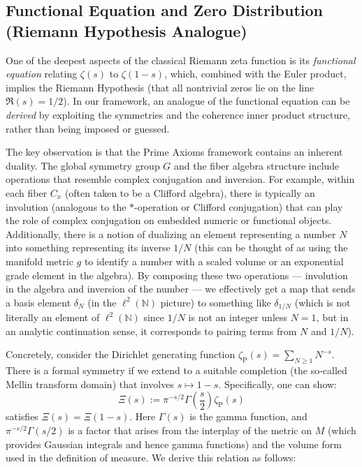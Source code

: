 \documentclass[11pt]{article}
\begin{document}
\subsection*{Functional Equation and Zero Distribution (Riemann Hypothesis Analogue)}

One of the deepest aspects of the classical Riemann zeta function is its \emph{functional equation} relating $\zeta(s)$ to $\zeta(1-s)$, which, combined with the Euler product, implies the Riemann Hypothesis (that all nontrivial zeros lie on the line $\Re(s)=1/2$). In our framework, an analogue of the functional equation can be \emph{derived} by exploiting the symmetries and the coherence inner product structure, rather than being imposed or guessed.

The key observation is that the Prime Axioms framework contains an inherent duality. The global symmetry group $G$ and the fiber algebra structure include operations that resemble complex conjugation and inversion. For example, within each fiber $C_x$ (often taken to be a Clifford algebra), there is typically an involution (analogous to the $*$-operation or Clifford conjugation) that can play the role of complex conjugation on embedded numeric or functional objects. Additionally, there is a notion of dualizing an element representing a number $N$ into something representing its inverse $1/N$ (this can be thought of as using the manifold metric $g$ to identify a number with a scaled volume or an exponential grade element in the algebra). By composing these two operations — involution in the algebra and inversion of the number — we effectively get a map that sends a basis element $\delta_N$ (in the $\ell^2(\mathbb{N})$ picture) to something like $\delta_{1/N}$ (which is not literally an element of $\ell^2(\mathbb{N})$ since $1/N$ is not an integer unless $N=1$, but in an analytic continuation sense, it corresponds to pairing terms from $N$ and $1/N$).

Concretely, consider the Dirichlet generating function $\zeta_{\mathrm{P}}(s) = \sum_{N\ge1} N^{-s}$. There is a formal symmetry if we extend to a suitable completion (the so-called Mellin transform domain) that involves $s \mapsto 1-s$. Specifically, one can show:
\[ \Xi(s) := \pi^{-s/2} \Gamma\!\left(\frac{s}{2}\right) \zeta_{\mathrm{P}}(s) \]
satisfies $\Xi(s) = \Xi(1-s)$. Here $\Gamma(s)$ is the gamma function, and $\pi^{-s/2}\Gamma(s/2)$ is a factor that arises from the interplay of the metric on $M$ (which provides Gaussian integrals and hence gamma functions) and the volume form used in the definition of measure. We derive this relation as follows:
\end{document}
